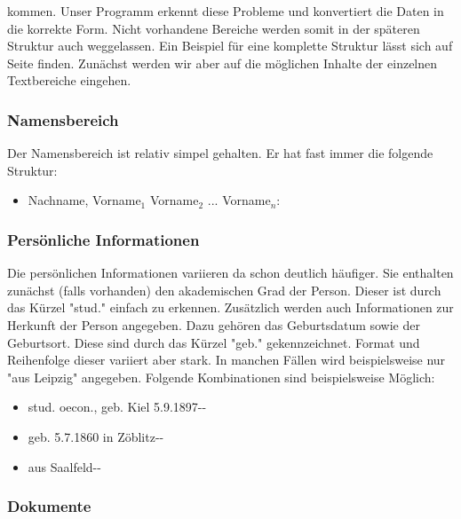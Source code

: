 \noindent
kommen. Unser Programm erkennt diese Probleme und konvertiert die Daten in die korrekte Form. Nicht vorhandene Bereiche werden somit in der späteren Struktur auch weggelassen. Ein Beispiel für eine komplette Struktur lässt sich auf Seite \pageref{sec:Beispielstruktur} finden. Zunächst werden wir aber auf die möglichen Inhalte der einzelnen Textbereiche eingehen.

\subsubsection{Namensbereich}
 \label{subsubsec:Namensbereich}

Der Namensbereich ist relativ simpel gehalten. Er hat fast immer die folgende Struktur: 

\begin{itemize}
 \item Nachname, Vorname$_1$ Vorname$_2$ ... Vorname$_n$:
\end{itemize} 
 
\subsubsection{Persönliche Informationen}
 \label{subsubsec:Persönliche Informationen}
 
Die persönlichen Informationen variieren da schon deutlich häufiger. Sie enthalten zunächst (falls vorhanden) den akademischen Grad der Person. Dieser ist durch das Kürzel "{}stud."{} einfach zu erkennen. Zusätzlich werden auch Informationen zur Herkunft der Person angegeben. Dazu gehören das Geburtsdatum sowie der Geburtsort. Diese sind durch das Kürzel "{}geb."{} gekennzeichnet. Format und Reihenfolge dieser variiert aber stark. In manchen Fällen wird beispielsweise nur "{}aus Leipzig"{} angegeben. Folgende Kombinationen sind beispielsweise Möglich: 

\begin{itemize}
 \item stud. oecon., geb. Kiel 5.9.1897-{}-
\vspace*{-0.2cm} 
 \item geb. 5.7.1860 in  Zöblitz-{}-
\vspace*{-0.2cm} 
 \item aus Saalfeld-{}-
\end{itemize} 
  
\subsubsection{Dokumente}  
 \label{subsubsec:Dokumente}

